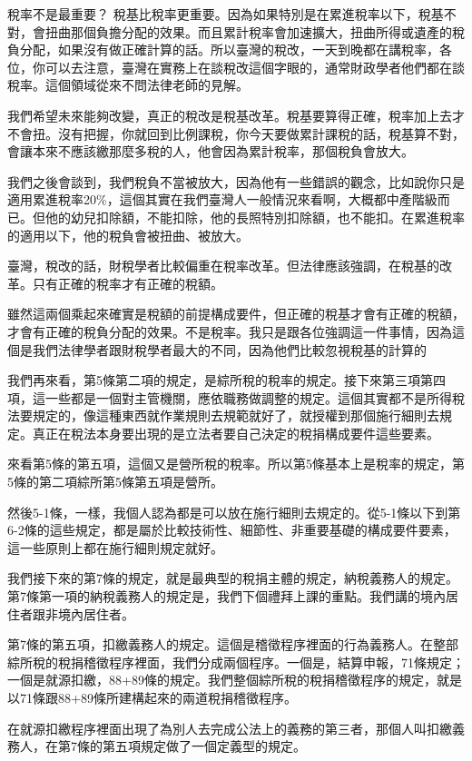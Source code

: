\documentclass[]{ctexbook}
\begin{document}
稅率不是最重要？ 稅基比稅率更重要。因為如果特別是在累進稅率以下，稅基不對，會扭曲那個負擔分配的效果。而且累計稅率會加速擴大，扭曲所得或遺產的稅負分配，如果沒有做正確計算的話。所以臺灣的稅改，一天到晚都在講稅率，各位，你可以去注意，臺灣在實務上在談稅改這個字眼的，通常財政學者他們都在談稅率。這個領域從來不問法律老師的見解。

我們希望未來能夠改變，真正的稅改是稅基改革。稅基要算得正確，稅率加上去才不會扭。沒有把握，你就回到比例課稅，你今天要做累計課稅的話，稅基算不對，會讓本來不應該繳那麼多稅的人，他會因為累計稅率，那個稅負會放大。

我們之後會談到，我們稅負不當被放大，因為他有一些錯誤的觀念，比如說你只是適用累進稅率20\%，這個其實在我們臺灣人一般情況來看啊，大概都中產階級而已。但他的幼兒扣除額，不能扣除，他的長照特別扣除額，也不能扣。在累進稅率的適用以下，他的稅負會被扭曲、被放大。

臺灣，稅改的話，財稅學者比較偏重在稅率改革。但法律應該強調，在稅基的改革。只有正確的稅率才有正確的稅額。

雖然這兩個乘起來確實是稅額的前提構成要件，但正確的稅基才會有正確的稅額，才會有正確的稅負分配的效果。不是稅率。我只是跟各位強調這一件事情，因為這個是我們法律學者跟財稅學者最大的不同，因為他們比較忽視稅基的計算的

我們再來看，第5條第二項的規定，是綜所稅的稅率的規定。接下來第三項第四項，這一些都是一個對主管機關，應依職務做調整的規定。這個其實都不是所得稅法要規定的，像這種東西就作業規則去規範就好了，就授權到那個施行細則去規定。真正在稅法本身要出現的是立法者要自己決定的稅捐構成要件這些要素。

來看第5條的第五項，這個又是營所稅的稅率。所以第5條基本上是稅率的規定，第5條的第二項綜所第5條第五項是營所。

然後5-1條，一樣，我個人認為都是可以放在施行細則去規定的。從5-1條以下到第6-2條的這些規定，都是屬於比較技術性、細節性、非重要基礎的構成要件要素，這一些原則上都在施行細則規定就好。

我們接下來的第7條的規定，就是最典型的稅捐主體的規定，納稅義務人的規定。第7條第一項的納稅義務人的規定是，我們下個禮拜上課的重點。我們講的境內居住者跟非境內居住者。

第7條的第五項，扣繳義務人的規定。這個是稽徵程序裡面的行為義務人。在整部綜所稅的稅捐稽徵程序裡面，我們分成兩個程序。一個是，結算申報，71條規定；一個是就源扣繳，88+89條的規定。我們整個綜所稅的稅捐稽徵程序的規定，就是以71條跟88+89條所建構起來的兩道稅捐稽徵程序。

在就源扣繳程序裡面出現了為別人去完成公法上的義務的第三者，那個人叫扣繳義務人，在第7條的第五項規定做了一個定義型的規定。
\end{document}
